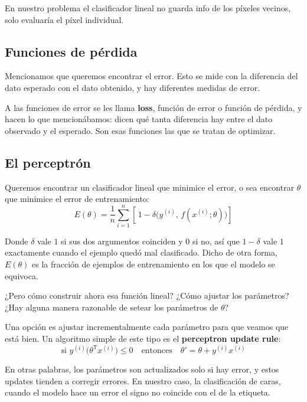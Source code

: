 \documentclass[11pt,letterpaper]{article}
\begin{document}
\begin{ojo}
  En nuestro problema el clasificador lineal no guarda info de los
  píxeles vecinos, solo evaluaría el píxel individual.
\end{ojo}


\subsection*{Funciones de pérdida}

Mencionamos que queremos encontrar el error. Esto se mide con la
diferencia del dato esperado con el dato obtenido, y hay diferentes
medidas de error.

A las funciones de error se les llama \textbf{loss}, función de error
o función de pérdida, y hacen lo que mencionábamos: dicen qué tanta
diferencia hay entre el dato observado y el esperado. Son esas
funciones las que se tratan de optimizar.


\subsection*{El perceptrón}

Queremos encontrar un clasificador lineal que minimice el error, o sea
encontrar $\theta$ que minimice el error de entrenamiento:
\[
    E(\theta) = \frac{1}{n} \sum_{i=1}^{n}
                \left[\, 1 - \delta\big(y^{(i)},\,
                f(x^{(i)}; \theta)\big) \right]
\]

Donde $\delta$ vale $1$ si sus dos argumentos coinciden y $0$ si no,
así que $1 - \delta$ vale $1$ exactamente cuando el ejemplo quedó mal
clasificado. Dicho de otra forma, $E(\theta)$ es la fracción de
ejemplos de entrenamiento en los que el modelo se equivoca.

¿Pero cómo construir ahora esa función lineal? ¿Cómo ajustar los
parámetros? ¿Hay alguna manera razonable de setear los parámetros de
$\theta$?

Una opción es ajustar incrementalmente cada parámetro para que veamos
que está bien. Un algoritmo simple de este tipo es el
\textbf{perceptron update rule}:
\[
    \text{si } y^{(i)} \big(\theta^{\mathsf{T}} x^{(i)}\big) \leq 0
    \quad\text{entonces}\quad
    \theta' = \theta + y^{(i)} x^{(i)}
\]

En otras palabras, los parámetros son actualizados solo si hay error, y
estos updates tienden a corregir errores. En nuestro caso, la
clasificación de caras, cuando el modelo hace un error el signo no
coincide con el de la etiqueta.
\end{document}
